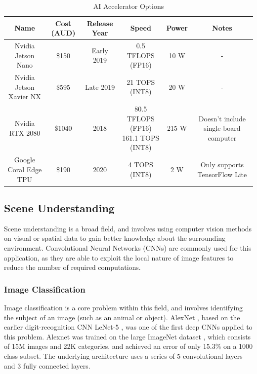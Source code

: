 \documentclass[12pt]{article}
\begin{document}
\begin{table}[H]
    \centering
\begin{adjustbox}{width=\textwidth}
    \begin{tabular}{c c c c c c}
    \toprule
    Name & Cost (AUD)\footnotemark[1] & Release Year & Speed & Power & Notes \\
    \midrule
    Nvidia Jetson Nano \cite{nvidiaJetsonNanoSystemonModule2019} & \$150 & Early 2019 & 0.5 TFLOPS (FP16) & 10 W & - \\
    Nvidia Jetson Xavier NX \cite{nvidiaJetsonXavierNX2019} & \$595 & Late 2019 & 21 TOPS (INT8) & 20 W & - \\
    Nvidia RTX 2080 \cite{nvidiaTuringGPUArchitecture2018} & \$1040 & 2018 & \makecell{80.5 TFLOPS (FP16)\\161.1 TOPS (INT8)} & 215 W & Doesn't include single-board computer \\
    Google Coral Edge TPU \cite{googlecoralCoralDevBoard2020} & \$190 & 2020 & 4 TOPS (INT8) & 2 W & Only supports TensorFlow Lite \\
    \bottomrule
    \end{tabular}
\end{adjustbox}
    \caption{AI Accelerator Options}
    \label{table:compute_element}
\end{table}

\pagebreak
\subsection{Scene Understanding}
Scene understanding is a broad field, and involves using computer vision methods
on visual or spatial data to gain better knowledge about the surrounding environment.
Convolutional Neural Networks (CNNs) are commonly used for this application, as they
are able to exploit the local nature of image features to reduce the number of required computations.

\subsubsection{Image Classification}
Image classification is a core problem within this field, and involves identifying the
subject of an image (such as an animal or object).
AlexNet \cite{krizhevskyImageNetClassificationDeep2012}, based on the earlier digit-recognition CNN LeNet-5
\cite{lecunGradientbasedLearningApplied1998}, was one of the first deep CNNs
applied to this problem. Alexnet was trained on the large ImageNet dataset \cite{jiadengImageNetLargescaleHierarchical2009},
which consists of 15M images and 22K categories,
and achieved an error of only 15.3\% on a 1000 class subset. The underlying architecture uses a series of 5 convolutional
layers and 3 fully connected layers.
\end{document}
